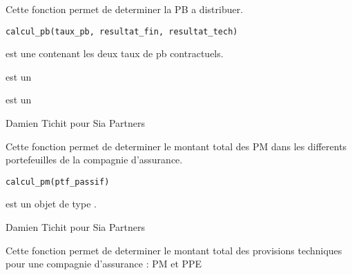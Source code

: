 \documentclass[a4paper]{book}
\begin{document}
%
\begin{Description}\relax
Cette fonction permet de determiner la PB a distribuer.
\end{Description}
%
\begin{Usage}
\begin{verbatim}
calcul_pb(taux_pb, resultat_fin, resultat_tech)
\end{verbatim}
\end{Usage}
%
\begin{Arguments}
\begin{ldescription}
\item[\code{taux\_pb}] est une  contenant les deux taux de pb contractuels.

\item[\code{resultat\_fin}] est un 

\item[\code{resultat\_tech}] est un 
\end{ldescription}
\end{Arguments}
%
\begin{Author}\relax
Damien Tichit pour Sia Partners
\end{Author}
%
\begin{Description}\relax
Cette fonction permet de determiner le montant total des PM dans les differents portefeuilles de la compagnie d'assurance.
\end{Description}
%
\begin{Usage}
\begin{verbatim}
calcul_pm(ptf_passif)
\end{verbatim}
\end{Usage}
%
\begin{Arguments}
\begin{ldescription}
\item[\code{ptf\_passif}] est un objet de type .
\end{ldescription}
\end{Arguments}
%
\begin{Author}\relax
Damien Tichit pour Sia Partners
\end{Author}
%
\begin{Description}\relax
Cette fonction permet de determiner le montant total des provisions techniques pour une compagnie d'assurance : PM et PPE
\end{Description}
\end{document}
